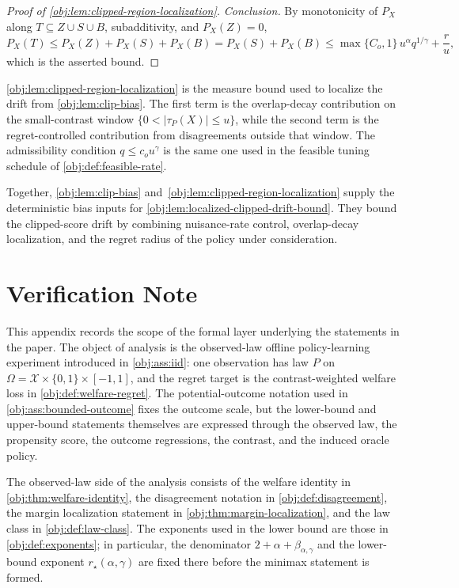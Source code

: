 \documentclass[11pt]{article}
\begin{document}
\begin{proof}[Proof of \cref{obj:lem:clipped-region-localization}]
\emph{Conclusion.}  By monotonicity of \(P_X\) along \(T\subseteq Z\cup S\cup B\), subadditivity, and \(P_X(Z)=0\),
\[
P_X(T)\le P_X(Z)+P_X(S)+P_X(B)=P_X(S)+P_X(B)
\le \max\{C_o,1\}\,u^\alpha q^{1/\gamma}+\frac{r}{u},
\]
which is the asserted bound. %
\end{proof}

\cref{obj:lem:clipped-region-localization} is the measure bound used to localize the drift from \cref{obj:lem:clip-bias}.  The first term is the overlap-decay contribution on the small-contrast window \(\{0<|\tau_P(X)|\le u\}\), while the second term is the regret-controlled contribution from disagreements outside that window.  The admissibility condition \(q\le c_o u^\gamma\) is the same one used in the feasible tuning schedule of \cref{obj:def:feasible-rate}.

Together, \cref{obj:lem:clip-bias} and~\cref{obj:lem:clipped-region-localization} supply the deterministic bias inputs for \cref{obj:lem:localized-clipped-drift-bound}.  They bound the clipped-score drift by combining nuisance-rate control, overlap-decay localization, and the regret radius of the policy under consideration.


\section{Verification Note}

This appendix records the scope of the formal layer underlying the statements in the paper.  The object of analysis is the observed-law offline policy-learning experiment introduced in \cref{obj:ass:iid}: one observation has law \(P\) on \(\Omega=\mathcal X\times\{0,1\}\times[-1,1]\), and the regret target is the contrast-weighted welfare loss in \cref{obj:def:welfare-regret}.  The potential-outcome notation used in \cref{obj:ass:bounded-outcome} fixes the outcome scale, but the lower-bound and upper-bound statements themselves are expressed through the observed law, the propensity score, the outcome regressions, the contrast, and the induced oracle policy.

The observed-law side of the analysis consists of the welfare identity in \cref{obj:thm:welfare-identity}, the disagreement notation in \cref{obj:def:disagreement}, the margin localization statement in \cref{obj:thm:margin-localization}, and the law class in \cref{obj:def:law-class}.  The exponents used in the lower bound are those in \cref{obj:def:exponents}; in particular, the denominator \(2+\alpha+\beta_{\alpha,\gamma}\) and the lower-bound exponent \(r_\star(\alpha,\gamma)\) are fixed there before the minimax statement is formed.
\end{document}
